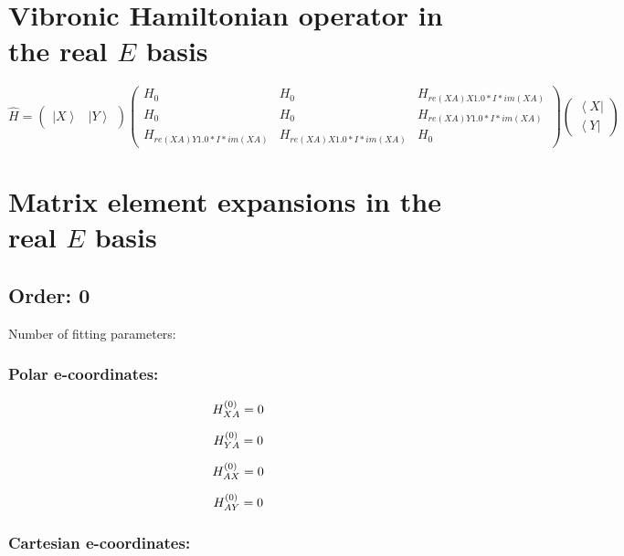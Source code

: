 \documentclass[fleqn]{article}
\begin{document}
\section{Vibronic Hamiltonian operator in the real $E$ basis}
$\hat{H}=\left(\begin{matrix}{\left|X\right\rangle } & {\left|Y\right\rangle }\end{matrix}\right) \left(\begin{matrix}H_{0} & H_{0} & H_{re(XA) X 1.0*I*im(XA)}\\H_{0} & H_{0} & H_{re(XA) Y 1.0*I*im(XA)}\\H_{re(XA) Y 1.0*I*im(XA)} & H_{re(XA) X 1.0*I*im(XA)} & H_{0}\end{matrix}\right) \left(\begin{matrix}{\left\langle X\right|}\\{\left\langle Y\right|}\end{matrix}\right)$
\section{Matrix element expansions in the real $E$ basis}
\subsection{Order: 0}
Number of fitting parameters: 
\subsubsection*{Polar e-coordinates:}

\begin{dmath*}
H_{XA}^{(0)}=0\\
\end{dmath*}

\begin{dmath*}
H_{YA}^{(0)}=0\\
\end{dmath*}

\begin{dmath*}
H_{AX}^{(0)}=0\\
\end{dmath*}

\begin{dmath*}
H_{AY}^{(0)}=0\\
\end{dmath*}
\subsubsection*{Cartesian e-coordinates:}
\end{document}
